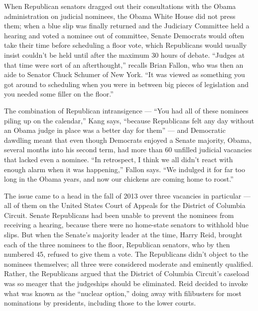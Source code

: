 When Republican senators dragged out their consultations with the Obama
administration on judicial nominees, the Obama White House did not press
them; when a blue slip was finally returned and the Judiciary Committee
held a hearing and voted a nominee out of committee, Senate Democrats
would often take their time before scheduling a floor vote, which
Republicans would usually insist couldn't be held until after the
maximum 30 hours of debate. ``Judges at that time were sort of an
afterthought,'' recalls Brian Fallon, who was then an aide to Senator
Chuck Schumer of New York. ``It was viewed as something you got around
to scheduling when you were in between big pieces of legislation and you
needed some filler on the floor.''

The combination of Republican intransigence --- ``You had all of these
nominees piling up on the calendar,'' Kang says, ``because Republicans
felt any day without an Obama judge in place was a better day for them''
--- and Democratic dawdling meant that even though Democrats enjoyed a
Senate majority, Obama, several months into his second term, had more
than 60 unfilled judicial vacancies that lacked even a nominee. ``In
retrospect, I think we all didn't react with enough alarm when it was
happening,'' Fallon says. ``We indulged it for far too long in the Obama
years, and now our chickens are coming home to roost.''

The issue came to a head in the fall of 2013 over three vacancies in
particular --- all of them on the United States Court of Appeals for the
District of Columbia Circuit. Senate Republicans had been unable to
prevent the nominees from receiving a hearing, because there were no
home-state senators to withhold blue slips. But when the Senate's
majority leader at the time, Harry Reid, brought each of the three
nominees to the floor, Republican senators, who by then numbered 45,
refused to give them a vote. The Republicans didn't object to the
nominees themselves; all three were considered moderate and eminently
qualified. Rather, the Republicans argued that the District of Columbia
Circuit's caseload was so meager that the judgeships should be
eliminated. Reid decided to invoke what was known as the ``nuclear
option,'' doing away with filibusters for most nominations by
presidents, including those to the lower courts.

